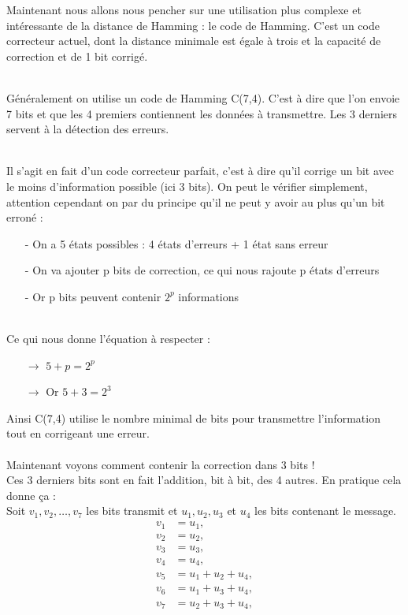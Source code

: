 Maintenant nous allons nous pencher sur une utilisation plus complexe et intéressante de la distance de Hamming : le code de Hamming. C’est un code correcteur actuel, dont la distance minimale est égale à trois et la capacité de correction et de 1 bit corrigé.


\\\tab Généralement on utilise un code de Hamming C(7,4). C'est à dire que l'on envoie 7 bits et que les 4 premiers contiennent les données à transmettre. Les 3 derniers servent à la détection des erreurs.

\\\tab Il s'agit en fait d'un code correcteur parfait, c'est à dire qu'il corrige un bit avec le moins d'information possible (ici 3 bits). On peut le vérifier simplement, attention cependant on par du principe qu'il ne peut y avoir au plus qu'un bit erroné :
\begin{enumerate}
  \item[-] On a 5 états possibles : 4 états d'erreurs + 1 état sans erreur
  \item[-] On va ajouter p bits de correction, ce qui nous rajoute p états d'erreurs
  \item[-] Or p bits peuvent contenir $2^p$ informations
\end{enumerate}
\\ Ce qui nous donne l'équation à respecter :
\begin{enumerate}
  \item[$\rightarrow$] $ 5 + p = 2^p$
  \item[$\rightarrow$] Or $ 5 + 3 = 2^3$
\end{enumerate}
Ainsi C(7,4) utilise le nombre minimal de bits pour transmettre l'information tout en corrigeant une erreur.
\\
\\ Maintenant voyons comment contenir la correction dans 3 bits !
\\ Ces 3 derniers bits sont en fait l'addition, bit à bit, des 4 autres. En pratique cela donne ça :
\\ Soit $v_1, v_2, \ldots, v_7$ les bits transmit et $u_1, u_2, u_3$ et $u_4$ les bits contenant le message.
\begin{align*}
  v_1 &= u_1,\\
  v_2 &= u_2,\\
  v_3 &= u_3,\\
  v_4 &= u_4,\\
  v_5 &= u_1 + u_2 + u_4,\\
  v_6 &= u_1 + u_3 + u_4,\\
  v_7 &= u_2 + u_3 + u_4,
\end{align*}

